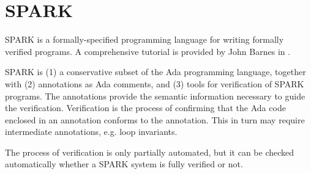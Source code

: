 \section*{SPARK}

SPARK is a formally-specified programming language for writing formally
verified programs\cite{spark-lrm}. A comprehensive tutorial is provided by John
Barnes in \cite{barnes}.

SPARK is (1) a conservative subset of the Ada programming language, together
with (2) annotations as Ada comments, and (3) tools for verification of SPARK
programs. The annotations provide the semantic information necessary to guide
the verification. Verification is the process of confirming that the Ada code
enclosed in an annotation conforms to the annotation. This in turn may require
intermediate annotations, e.g. loop invariants.

The process of verification is only partially automated, but it can be checked
automatically whether a SPARK system is fully verified or not.

